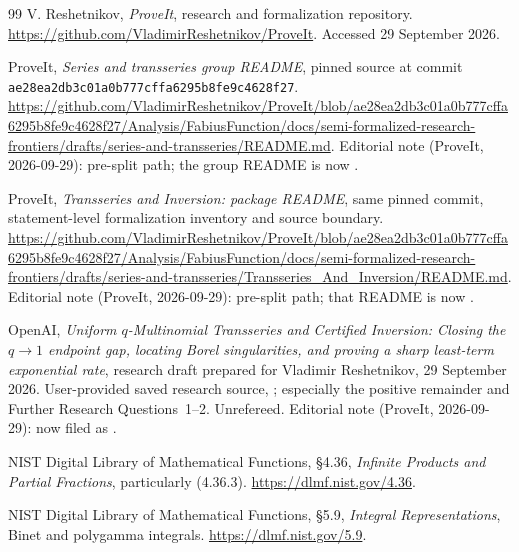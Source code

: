 \documentclass[11pt,a4paper]{article}
\numberwithin{equation}{section}
\theoremstyle{definition}\newtheorem{definition}[theorem]{Definition}
\theoremstyle{remark}\newtheorem{remark}[theorem]{Remark}
\begin{document}
\begin{thebibliography}{99}
V. Reshetnikov, \emph{ProveIt}, research and formalization repository.
\url{https://github.com/VladimirReshetnikov/ProveIt}.
Accessed 29 September 2026.

ProveIt, \emph{Series and transseries group README}, pinned source at commit
\texttt{ae28ea2db3c01a0b777cffa6295b8fe9c4628f27}.
\url{https://github.com/VladimirReshetnikov/ProveIt/blob/ae28ea2db3c01a0b777cffa6295b8fe9c4628f27/Analysis/FabiusFunction/docs/semi-formalized-research-frontiers/drafts/series-and-transseries/README.md}.
Editorial note (ProveIt, 2026-09-29): pre-split path; the group README is now
.

ProveIt, \emph{Transseries and Inversion: package README}, same pinned
commit, statement-level formalization inventory and source boundary.
\url{https://github.com/VladimirReshetnikov/ProveIt/blob/ae28ea2db3c01a0b777cffa6295b8fe9c4628f27/Analysis/FabiusFunction/docs/semi-formalized-research-frontiers/drafts/series-and-transseries/Transseries_And_Inversion/README.md}.
Editorial note (ProveIt, 2026-09-29): pre-split path; that README is now
.

OpenAI, \emph{Uniform $q$-Multinomial Transseries and Certified Inversion:
Closing the $q\to1$ endpoint gap, locating Borel singularities, and proving
a sharp least-term exponential rate}, research draft prepared for
Vladimir Reshetnikov, 29 September 2026. User-provided saved research
source, ; especially the
positive remainder and Further Research Questions~1--2. Unrefereed.
Editorial note (ProveIt, 2026-09-29): now filed as
.

NIST Digital Library of Mathematical Functions, \S4.36,
\emph{Infinite Products and Partial Fractions}, particularly (4.36.3).
\url{https://dlmf.nist.gov/4.36}.

NIST Digital Library of Mathematical Functions, \S5.9,
\emph{Integral Representations}, Binet and polygamma integrals.
\url{https://dlmf.nist.gov/5.9}.


\end{thebibliography}
\end{document}
